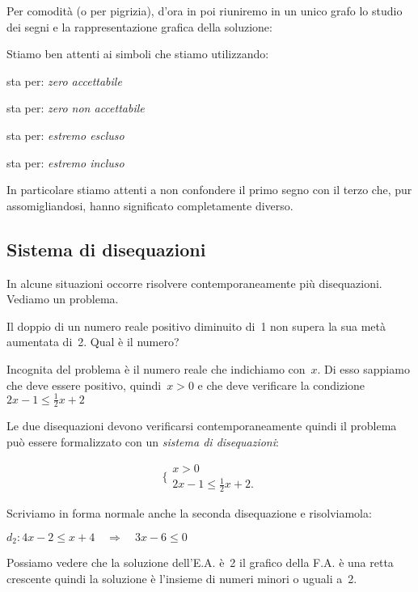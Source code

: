 \osservazione Per comodità (o per pigrizia), d'ora in poi riuniremo in un 
unico grafo lo studio dei segni e la rappresentazione grafica della soluzione: 



Stiamo ben attenti ai simboli che stiamo utilizzando:
\begin{multicols}{2}
 
sta per: \emph{zero accettabile}
 
sta per: \emph{zero non accettabile}
 
sta per: \emph{estremo escluso}
 
sta per: \emph{estremo incluso}
\end{multicols}

In particolare stiamo attenti a non confondere il primo segno 
con il terzo che, pur assomigliandosi, 
hanno significato completamente diverso.

\subsection{Sistema di disequazioni}
\label{sec:dis_sistemi}

In alcune situazioni occorre risolvere contemporaneamente più
disequazioni. Vediamo un problema.

\begin{problema}
Il doppio di un numero reale positivo diminuito di~1 non supera la sua
metà aumentata di~2. Qual è il numero?
\end{problema}

Incognita del problema è il numero reale che indichiamo con~$x$. Di esso
sappiamo che deve essere positivo, quindi~$x>0$ e che deve verificare
la condizione~$2x-1\le \frac{1}{2}x+2$

Le due disequazioni devono verificarsi contemporaneamente quindi 
il problema può essere formalizzato con un \emph{sistema di disequazioni}:

\[\bigg \{%
\begin{array}{l}
 x>0\\
 2x-1\le\frac{1}{2}x+2.
\end{array}\]

Scriviamo in forma normale anche la seconda disequazione e risolviamola:

$d_2:4x-2\le x+4 \quad \Rightarrow \quad 3x -6 \le 0$

Possiamo vedere che la soluzione dell'E.A. è~2 
il grafico della F.A. è una retta crescente
quindi la soluzione è l'insieme di numeri minori o uguali a~2.

